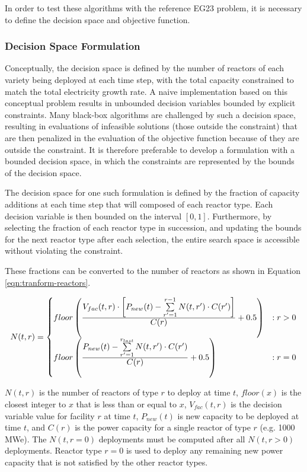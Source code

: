 In order to test these algorithms with the reference EG23 problem, it is
necessary to define the decision space and objective function.

\subsubsection{Decision Space Formulation}

Conceptually, the decision space is defined by the number of reactors of each
variety being deployed at each time step, with the total capacity constrained
to match the total electricity growth rate.  A naive implementation based on
this conceptual problem results in unbounded decision variables bounded by
explicit constraints.  Many black-box algorithms are challenged by such a
decision space, resulting in evaluations of infeasible solutions (those
outside the constraint) that are then penalized in the evaluation of the
objective function because of they are outside the constraint.  It is
therefore preferable to develop a formulation with a bounded decision space,
in which the constraints are represented by the bounds of the decision space.

The decision space for one such formulation is defined by the fraction of
capacity additions at each time step that will composed of each reactor type.
Each decision variable is then bounded on the interval $[0,1]$.  Furthermore,
by selecting the fraction of each reactor type in succession, and updating the
bounds for the next reactor type after each selection, the entire search space
is accessible without violating the constraint.

These fractions can be converted to the number of reactors as shown in
Equation \ref{eqn:tranform-reactors}.

\begin{equation}
    N(t, r) =
    \begin{cases}
        floor\left(\frac{
            \mathlarger{V_{fac}(t,r) \cdot \left[P_{new}(t) - \sum\limits_{r'=1}^{r-1} N(t,r') \cdot C(r')\right]}
        }{\mathlarger{C(r)}} + 0.5\right) & : r > 0 \\
        floor\left(\frac{
                \mathlarger{P_{new}(t) - \sum\limits_{r'=1}^{r_{last}} N(t,r') \cdot C(r')}
        }{\mathlarger{C(r)}} + 0.5\right) & : r = 0
    \end{cases}
    \label{eqn:transform-reactors}
\end{equation}

$N(t, r)$ is the number of reactors of type $r$ to deploy at time $t$,
$floor(x)$ is the closest integer to $x$ that is less than or equal to $x$,
$V_{fac}(t,r)$ is the decision variable value for facility $r$ at time $t$,
$P_{new}(t)$ is new capacity to be deployed at time $t$, and $C(r)$ is the
power capacity for a single reactor of type $r$ (e.g. 1000 MWe). The
$N(t,r=0)$ deployments must be computed after all $N(t, r > 0)$ deployments.
Reactor type $r=0$ is used to deploy any remaining new power capacity that is
not satisfied by the other reactor types.

